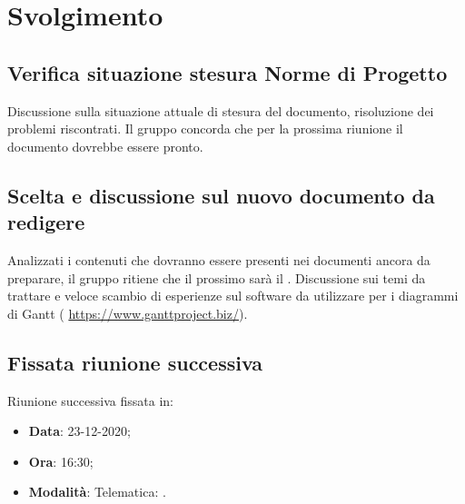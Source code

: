 \documentclass[]{article}
\begin{document}
	\newpage

	\section{Svolgimento}
		\subsection{Verifica situazione stesura Norme di Progetto}
		Discussione sulla situazione attuale di stesura del documento, risoluzione dei problemi riscontrati. Il gruppo concorda che per la prossima riunione il documento dovrebbe essere pronto.

		\subsection{Scelta e discussione sul nuovo documento da redigere}
		Analizzati i contenuti che dovranno essere presenti nei documenti ancora da preparare, il gruppo ritiene che il prossimo sarà il . Discussione sui temi da trattare e veloce scambio di esperienze sul software da utilizzare per i diagrammi di Gantt ( \url{https://www.ganttproject.biz/}).

		\subsection{Fissata riunione successiva}
		Riunione successiva fissata in:
		\begin{itemize}
			\item \textbf{Data}: 23-12-2020;
			\item \textbf{Ora}: 16:30;
			\item \textbf{Modalità}: Telematica: .
		\end{itemize}
	
\end{document}
